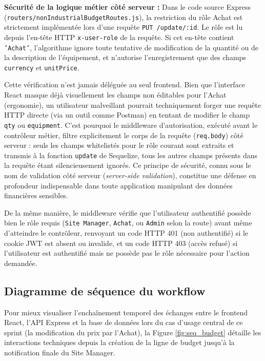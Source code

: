 \textbf{Sécurité de la logique métier côté serveur :}
Dans le code source Express (\texttt{routers/nonIndustrialBudgetRoutes.js}), la restriction du rôle Achat est strictement implémentée lors d'une requête \texttt{PUT /update/:id}. Le rôle est lu depuis l'en-tête HTTP \texttt{x-user-role} de la requête. Si cet en-tête contient \texttt{'Achat'}, l'algorithme ignore toute tentative de modification de la quantité ou de la description de l'équipement, et n'autorise l'enregistrement que des champs \texttt{currency} et \texttt{unitPrice}.

Cette vérification n'est jamais déléguée au seul frontend. Bien que l'interface React masque déjà visuellement les champs non éditables pour l'Achat (ergonomie), un utilisateur malveillant pourrait techniquement forger une requête HTTP directe (via un outil comme Postman) en tentant de modifier le champ \texttt{qty} ou \texttt{equipment}. C'est pourquoi le middleware d'autorisation, exécuté avant le contrôleur métier, filtre explicitement le corps de la requête (\texttt{req.body}) côté serveur : seuls les champs whitelistés pour le rôle courant sont extraits et transmis à la fonction \texttt{update} de Sequelize, tous les autres champs présents dans la requête étant silencieusement ignorés. Ce principe de sécurité, connu sous le nom de validation côté serveur (\textit{server-side validation}), constitue une défense en profondeur indispensable dans toute application manipulant des données financières sensibles.

De la même manière, le middleware vérifie que l'utilisateur authentifié possède bien le rôle requis (\texttt{Site Manager}, \texttt{Achat}, ou \texttt{Admin} selon la route) avant même d'atteindre le contrôleur, renvoyant un code HTTP 401 (non authentifié) si le cookie JWT est absent ou invalide, et un code HTTP 403 (accès refusé) si l'utilisateur est authentifié mais ne possède pas le rôle nécessaire pour l'action demandée.

\subsection{Diagramme de séquence du workflow}
Pour mieux visualiser l'enchaînement temporel des échanges entre le frontend React, l'API Express et la base de données lors du cas d'usage central de ce sprint (la modification du prix par l'Achat), la Figure \ref{fig:seq_budget} détaille les interactions techniques depuis la création de la ligne de budget jusqu'à la notification finale du Site Manager.

